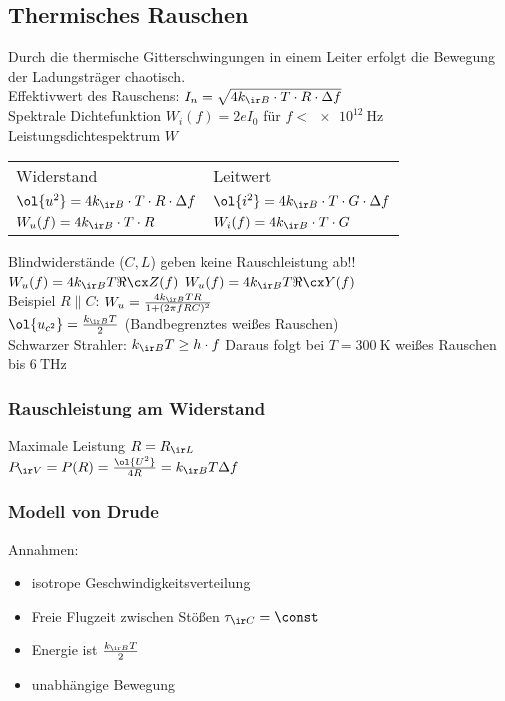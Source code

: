 \documentclass[fs, footer]{latex4ei}
\begin{document}
\begin{multicols}{4}
{	\subsection{Thermisches Rauschen}
	Durch die thermische Gitterschwingungen in einem Leiter erfolgt die Bewegung der Ladungsträger chaotisch.\\
	Effektivwert des Rauschens: $I_n = \sqrt{4 k_{\ir B} \cdot T \cdot R \cdot \Delta f}$\\
	Spektrale Dichtefunktion $W_i(f) = 2 e I_0$ \qquad für $f < \SI{e12}{\hertz}$\\
	Leistungsdichtespektrum $W$
	
	\begin{tabular}{ll}
	Widerstand & Leitwert\\ \mrule
	$\ol{u^2} = 4 k_{\ir B} \cdot T \cdot R \cdot \Delta f$ & $\ol{i^2} = 4 k_{\ir B} \cdot T \cdot G \cdot \Delta f$\\
	$W_u(f) = 4 k_{\ir B} \cdot T \cdot R$ & $W_i(f) = 4 k_{\ir B} \cdot T \cdot G$
	\end{tabular}

	Blindwiderstände ($C,L$) geben keine Rauschleistung ab!! \\
	$W_u(f) = 4k_{\ir B} T \Re{\cx Z(f)}$ \qquad $W_u(f) = 4k_{\ir B} T \Re{\cx Y(f)}$\\
	
	Beispiel $R \parallel C$: $W_u = \frac{4k_{\ir B}TR}{1+(2\pi f RC)^2}$\\
	$\ol{u_{c^2}} = \frac{k_{\ir B} T}{2}$ \qquad (Bandbegrenztes weißes Rauschen)\\
	
	Schwarzer Strahler: $k_{\ir B} T \ge h \cdot f$ Daraus folgt bei $T=\SI{300}{\kelvin}$ weißes Rauschen  bis $\SI{6}{\tera\hertz}$\\
	
		\subsubsection{Rauschleistung am Widerstand}
		Maximale Leistung $R = R_{\ir L}$\\
		$P_{\ir V} = P(R) = \frac{\ol{U^2}}{4 R} = k_{\ir B} T \Delta f$

		\subsubsection{Modell von Drude}
		Annahmen: 
		\begin{itemize}
			\item isotrope Geschwindigkeitsverteilung
			\item Freie Flugzeit zwischen Stößen $\tau_{\ir C} = \const$
			\item Energie ist $\frac{k_{\ir B} T}{2}$
			\item unabhängige Bewegung
		\end{itemize}

}
\end{multicols}
\end{document}
